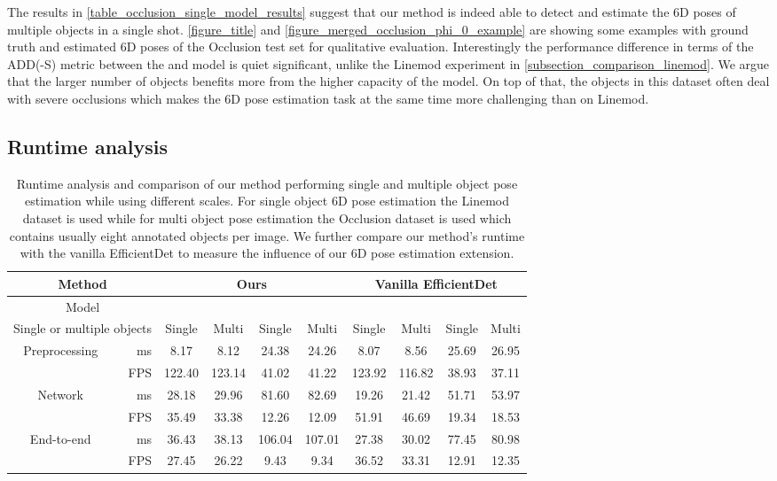 \documentclass[twocolumn, 10pt, letterpaper]{article}
\begin{document}
 The results in \autoref{table_occlusion_single_model_results} suggest that our method is indeed able to detect and estimate the 6D poses of multiple objects in a single shot. \autoref{figure_title} and \autoref{figure_merged_occlusion_phi_0_example} are showing some examples with ground truth and estimated 6D poses of the Occlusion test set for qualitative evaluation. Interestingly the performance difference in terms of the ADD(-S) metric between the  and  model is quiet significant, unlike the Linemod experiment in \autoref{subsection_comparison_linemod}. We argue that the larger number of objects benefits more from the higher capacity of the  model. On top of that, the objects in this dataset often deal with severe occlusions which makes the 6D pose estimation task at the same time more challenging than on Linemod.

\subsection{Runtime analysis}
\label{subsection_runtime_analysis}

\begin{table*}
\centering
\begin{tabular}{ | c  r | c  c | c  c | c  c | c  c |}
 \hline
 \multicolumn{2}{|c|}{Method} & \multicolumn{4}{c|}{\textbf{Ours}} & \multicolumn{4}{c|}{{Vanilla EfficientDet\cite{EfficientDet}}}\\
 \hline
 \multicolumn{2}{|c|}{Model} & \multicolumn{2}{c|}{} & \multicolumn{2}{c|}{{}} & \multicolumn{2}{c|}{} & \multicolumn{2}{c|}{} \\
 \hline
	\multicolumn{2}{|c|}{Single or multiple objects}  & Single & Multi & Single & Multi & Single & Multi & Single & Multi \\
 \hline
 \multirow{2}{*}{Preprocessing} & ms & 8.17 & 8.12 & 24.38 & 24.26 & 8.07 & 8.56 & 25.69 & 26.95 \\
																& FPS & 122.40 & 123.14 & 41.02 & 41.22 & 123.92 & 116.82 & 38.93 & 37.11 \\
 \hline
 \multirow{2}{*}{Network} & ms & 28.18 & 29.96 & 81.60 & 82.69 & 19.26 & 21.42 & 51.71 & 53.97 \\
													& FPS & 35.49 & 33.38 & 12.26 & 12.09 & 51.91 & 46.69 & 19.34 & 18.53 \\
 \hline
 \multirow{2}{*}{End-to-end} 	& ms & 36.43 & 38.13 & 106.04 & 107.01 & 27.38 & 30.02 & 77.45 & 80.98 \\
															& FPS & 27.45 & 26.22 & 9.43 & 9.34 & 36.52 & 33.31 & 12.91 & 12.35 \\
 \hline
\end{tabular}
\caption{Runtime analysis and comparison of our method performing single and multiple object pose estimation while using different scales. For single object 6D pose estimation the Linemod dataset is used while for multi object pose estimation the Occlusion dataset is used which contains usually eight annotated objects per image. We further compare our method's runtime with the vanilla EfficientDet\cite{EfficientDet} to measure the influence of our 6D pose estimation extension.}
\label{table_runtime_analysis}
\end{table*}
\end{document}
